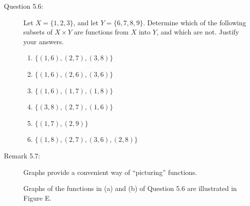 \documentclass{book}
\begin{document}
\begin{description}
\item[Question 5.6:] Let $X = \{ 1, 2, 3 \}$, and let $Y = \{ 6, 7, 8, 9 \}$. Determine which of the following subsets of $X \times Y$ are functions from $X$ into $Y$, and which are not. Justify your answers.
\begin{enumerate}[\hspace{1cm}(a)]
  \item $\{ (1,6), (2,7), (3,8) \}$
  \item $\{ (1,6), (2,6), (3,6) \}$
  \item $\{ (1,6), (1,7), (1,8) \}$
  \item $\{ (3,8), (2,7), (1,6) \}$
  \item $\{ (1,7), (2,9) \}$
  \item $\{ (1,8), (2,7), (3,6), (2,8) \}$
\end{enumerate}

\item[Remark 5.7:] Graphs provide a convenient way of ``picturing'' functions. 

  Graphs of the functions in (a) and (b) of Question 5.6 are illustrated in Figure E.



\end{description}
\end{document}
